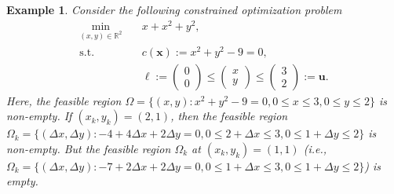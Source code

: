 \documentclass[aos]{imsart}
\numberwithin{equation}{section}
\theoremstyle{plain}
\newtheorem{example}{Example}
\begin{document}
\begin{example}
\label{exmp1}
Consider the following constrained optimization problem
\begin{equation}
    \begin{split}
        \min_{(x,y) \in \mathbb{R}^{2}} & \hspace{1em} x + x^2 + y^2,\\
        \text{s.t.} & \hspace{1em} c(\bm{x}) := x^2 + y^2 -9 =  0,\\
        & \hspace{1em} \bm{\ell} := \left(\begin{array}{c}
             0  \\
             0
        \end{array} \right) \leq \left(\begin{array}{c}
             x  \\
             y 
        \end{array} \right) \leq \left(\begin{array}{c}
             3  \\
             2
        \end{array} \right) := \bm{u}.
    \end{split}
\end{equation}
Here, the feasible region $\Omega = \{(x,y): x^2 + y^2 -9 =0, 0 \leq x \leq 3, 0 \leq y \leq 2\}$ is non-empty. If $(x_k,y_k) = (2,1)$, then the feasible region $\Omega_k = \{(\Delta x,\Delta y): -4 + 4\Delta x + 2\Delta y =0, 0 \leq 2+\Delta x \leq 3, 0 \leq 1+\Delta y \leq 2\}$ is non-empty. But the feasible region $\Omega_k$ at $(x_k,y_k) = (1,1)$ (i.e., $\Omega_k = \{(\Delta x,\Delta y): -7 + 2 \Delta x + 2 \Delta y = 0, 0 \leq 1 + \Delta x \leq 3, 0 \leq 1 + \Delta y \leq 2 \}$) is empty. 
\end{example}
\end{document}
